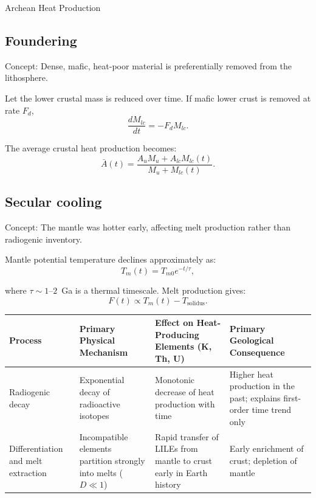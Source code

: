 \begin{activity}{Archean Heat Production}
\subsection*{Foundering}
Concept: Dense, mafic, heat-poor material is preferentially removed from the lithosphere.

Let the lower crustal mass is reduced over time.  If mafic lower crust is removed at rate $F_d$,
\[
\frac{dM_{lc}}{dt} = -F_d M_{lc}.
\]

The average crustal heat production becomes:
\[
\bar{A}(t) = \frac{A_u M_u + A_{lc} M_{lc}(t)}{M_u + M_{lc}(t)}.
\]



\subsection*{Secular cooling}
Concept: The mantle was hotter early, affecting melt production rather than radiogenic inventory.

Mantle potential temperature declines approximately as:
\[
T_m(t) = T_{m0} e^{-t/\tau},
\]

where \(\tau \sim 1\text{--}2\)~Ga is a thermal timescale.
Melt production gives:
\[
F(t) \propto T_m(t) - T_{\text{solidus}}.
\]



\begin{table}[h!]
    \centering
    \begin{tabularx}{\textwidth}{@{}XXXX@{}}
    \toprule
    \textbf{Process} &
    \textbf{Primary Physical Mechanism} &
    \textbf{Effect on Heat-Producing Elements (K, Th, U)} &
    \textbf{Primary Geological Consequence} \\
    \midrule
    Radiogenic decay &
    Exponential decay of radioactive isotopes &
    Monotonic decrease of heat production with time &
    Higher heat production in the past; explains first-order time trend only \\[0.3em]

    Differentiation and melt extraction &
    Incompatible elements partition strongly into melts ($D \ll 1$) &
    Rapid transfer of LILEs from mantle to crust early in Earth history &
    Early enrichment of crust; depletion of mantle \\[0.3em]


\end{tabularx}
\end{table}
\end{activity}
